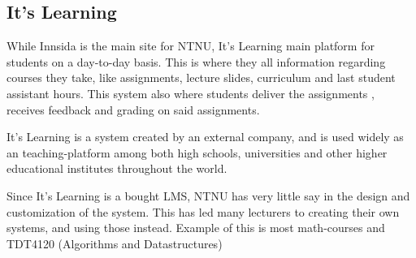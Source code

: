 \subsection{It's Learning}
While Innsida is the main site for NTNU, It’s Learning main platform for students on a day-to-day basis. This is where they all information regarding courses they take, like assignments, lecture slides, curriculum and last student assistant hours. This system also  where students deliver the assignments , receives feedback and grading on said assignments. 

It’s Learning is a system created by an external company, and is used widely as an teaching-platform among both high schools, universities and other higher educational institutes throughout the world. 

Since It’s Learning is a bought LMS, NTNU has very little say in the design and customization of the system. This has led many lecturers to creating their own systems, and using those instead. Example of this is most math-courses and TDT4120 (Algorithms and Datastructures)